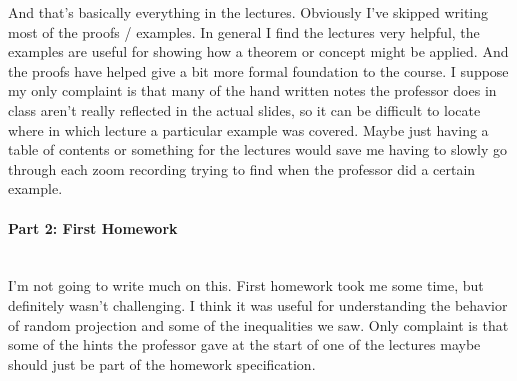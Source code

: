 \documentclass[12pt]{article}
\begin{document}
    And that's basically everything in the lectures. Obviously I've skipped writing most of the proofs / examples.
    In general I find the lectures very helpful, the examples are useful for showing how a theorem or concept might
    be applied. And the proofs have helped give a bit more formal foundation to the course. I suppose my only complaint
    is that many of the hand written notes the professor does in class aren't really reflected in the actual slides, so
    it can be difficult to locate where in which lecture a particular example was covered. Maybe just having a 
    table of contents or something for the lectures would save me having to slowly go through each zoom recording trying 
    to find when the professor did a certain example.

    \paragraph{Part 2: First Homework}~\\
    I'm not going to write much on this. First homework took me some time, but definitely wasn't challenging.
    I think it was useful for understanding the behavior of random projection and some of the inequalities we saw.
    Only complaint is that some of the hints the professor gave at the start of one of the lectures maybe should just be part 
    of the homework specification.
\end{document}
